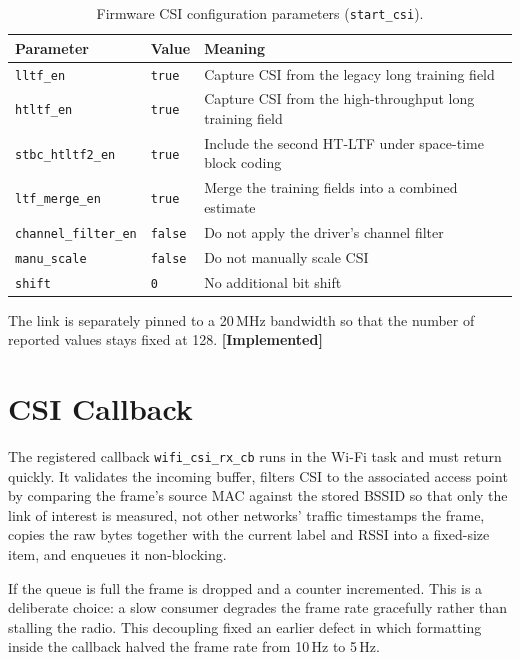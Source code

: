 \documentclass[11pt,a4paper,oneside]{report}
\newcommand{\evidencetag}[2]{{\small\sffamily\bfseries\textcolor{#1}{[#2]}}}
\newcommand{\Impl}{\evidencetag{good}{Implemented}}
\newcommand{\code}[1]{\texttt{\small #1}}
\begin{document}
\begin{table}[H]
\centering
\caption{Firmware CSI configuration parameters (\code{start\_csi}).}
\label{tab:csicfg}
\begin{tabularx}{\linewidth}{@{}llX@{}}
\toprule
\textbf{Parameter} & \textbf{Value} & \textbf{Meaning} \\
\midrule
\code{lltf\_en}         & \code{true}  & Capture CSI from the legacy long training field \\
\code{htltf\_en}        & \code{true}  & Capture CSI from the high-throughput long training field \\
\code{stbc\_htltf2\_en} & \code{true}  & Include the second HT-LTF under space-time block coding \\
\code{ltf\_merge\_en}   & \code{true}  & Merge the training fields into a combined estimate \\
\code{channel\_filter\_en} & \code{false} & Do not apply the driver's channel filter \\
\code{manu\_scale}      & \code{false} & Do not manually scale CSI \\
\code{shift}            & \code{0}     & No additional bit shift \\
\bottomrule
\end{tabularx}
\end{table}

\noindent
The link is separately pinned to a 20\,MHz bandwidth so that the number of
reported values stays fixed at 128. \Impl

\section{CSI Callback}

The registered callback \code{wifi\_csi\_rx\_cb} runs in the Wi-Fi task and
must return quickly. It validates the incoming buffer, filters CSI to the
associated access point by comparing the frame's source MAC against the stored
BSSID so that only the link of interest is measured, not other networks'
traffic timestamps the frame, copies the raw bytes together with the
current label and RSSI into a fixed-size item, and enqueues it non-blocking.

If the queue is full the frame is dropped and a counter incremented. This is a
deliberate choice: a slow consumer degrades the frame rate gracefully rather
than stalling the radio. This decoupling fixed an earlier defect in which
formatting inside the callback halved the frame rate from 10\,Hz to 5\,Hz.
\end{document}
